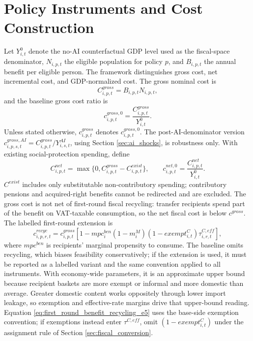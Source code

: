 \documentclass[11pt,a4paper]{article}
\begin{document}
\section{Policy Instruments and Cost Construction}\label{sec:policy_costs}

Let $Y^0_{i,t}$ denote the no-AI counterfactual GDP level used as the fiscal-space denominator, $N_{i,p,t}$ the eligible population for policy $p$, and $B_{i,p,t}$ the annual benefit per eligible person. The framework distinguishes gross cost, net incremental cost, and GDP-normalized cost. The gross nominal cost is
\begin{equation}
    C^{gross}_{i,p,t}=B_{i,p,t}N_{i,p,t},
\end{equation}
and the baseline gross cost ratio is
\begin{equation}
    c^{gross,0}_{i,p,t}=\frac{C^{gross}_{i,p,t}}{Y^0_{i,t}}.
\end{equation}
Unless stated otherwise, $c^{gross}_{i,p,t}$ denotes $c^{gross,0}_{i,p,t}$. The post-AI-denominator version $c^{gross,AI}_{i,p,s,t}=C^{gross}_{i,p,t}/Y^{AI}_{i,s,t}$, using Section \ref{sec:ai_shocks}, is robustness only. With existing social-protection spending, define
\begin{equation}
    C^{net}_{i,p,t}=\max\{0,C^{gross}_{i,p,t}-C^{exist}_{i,p,t}\},
    \qquad
    c^{net,0}_{i,p,t}=\frac{C^{net}_{i,p,t}}{Y^0_{i,t}}.
\end{equation}
$C^{exist}$ includes only substitutable non-contributory spending; contributory pensions and acquired-right benefits cannot be redirected and are excluded.
The gross cost is not net of first-round fiscal recycling: transfer recipients spend part of the benefit on VAT-taxable consumption, so the net fiscal cost is below $c^{gross}$. The labelled first-round extension is
\begin{equation}\label{eq:first_round_benefit_recycling_e5}
    c^{recyc}_{i,p,r,t}=c^{gross}_{i,p,t}\left[1-mpc^{ben}_i(1-m^M_i)(1-exempt^C_{i,t})\tau^{C,eff}_{i,r,t}\right],
\end{equation}
where $mpc^{ben}$ is recipients' marginal propensity to consume. The baseline omits recycling, which biases feasibility conservatively; if the extension is used, it must be reported as a labelled variant and the same convention applied to all instruments. With economy-wide parameters, it is an approximate upper bound because recipient baskets are more exempt or informal and more domestic than average. Greater domestic content works oppositely through lower import leakage, so exemption and effective-rate margins drive that upper-bound reading. Equation \eqref{eq:first_round_benefit_recycling_e5} uses the base-side exemption convention; if exemptions instead enter $\tau^{C,eff}$, omit $(1-exempt^C_{i,t})$ under the assignment rule of Section \ref{sec:fiscal_conversion}.
\end{document}

